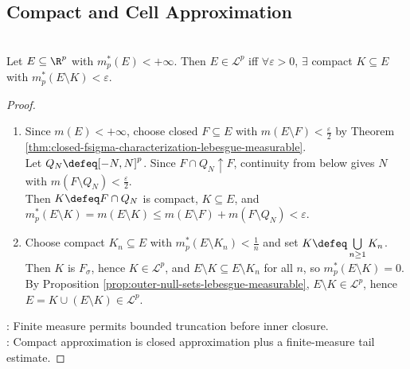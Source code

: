\subsection{Compact and Cell Approximation}
\begin{theorem} \label{thm:compact-characterization-finite-outer-measure} \\
Let $E\subseteq\R^p$ with $m_p^\ast(E)<+\infty$. Then $E\in\mathcal{L}^p$ iff $\forall\varepsilon>0$, $\exists$ compact $K\subseteq E$ with $m_p^\ast(E\setminus K)<\varepsilon$.
\begin{proof}
\begin{enumerate}[label=\roman*.]
\setlength{\itemsep}{0pt}
\item[$(\Rightarrow)$] Since $m(E)<+\infty$, choose closed $F\subseteq E$ with $m(E\setminus F)<\frac{\varepsilon}{2}$ by Theorem \ref{thm:closed-fsigma-characterization-lebesgue-measurable}.\\
Let $Q_N\defeq[-N,N]^p$. Since $F\cap Q_N\uparrow F$, continuity from below gives $N$ with $m(F\setminus Q_N)<\frac{\varepsilon}{2}$.\\
Then $K\defeq F\cap Q_N$ is compact, $K\subseteq E$, and $m_p^\ast(E\setminus K)=m(E\setminus K)\leq m(E\setminus F)+m(F\setminus Q_N)<\varepsilon$.
\item[$(\Leftarrow)$] Choose compact $K_n\subseteq E$ with $m_p^\ast(E\setminus K_n)<\frac{1}{n}$ and set $K\defeq\bigcup\limits_{n\geq1}K_n$.\\
Then $K$ is $F_\sigma$, hence $K\in\mathcal{L}^p$, and $E\setminus K\subseteq E\setminus K_n$ for all $n$, so $m_p^\ast(E\setminus K)=0$.\\
By Proposition \ref{prop:outer-null-sets-lebesgue-measurable}, $E\setminus K\in\mathcal{L}^p$, hence $E=K\cup(E\setminus K)\in\mathcal{L}^p$.
\end{enumerate}
: Finite measure permits bounded truncation before inner closure.\\
: Compact approximation is closed approximation plus a finite-measure tail estimate.
\end{proof}
\end{theorem}

